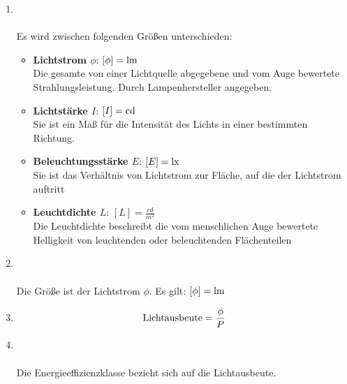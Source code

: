 \begin{enumerate}
    \item   {} \\\\
            
            Es wird zwischen folgenden Größen unterschieden:
            \begin{itemize}
                \item \textbf{Lichtstrom $\phi$}: $\left[\phi\right] = \textnormal{lm}$ \\ Die gesamte von einer Lichtquelle abgegebene und vom Auge bewertete Strahlungsleistung. Durch Lampenhersteller angegeben.
                \item \textbf{Lichtstärke $I$}: $\left[I\right] = \textnormal{cd}$ \\ Sie ist ein Maß für die Intensität des Lichts in einer bestimmten Richtung.
                \item \textbf{Beleuchtungsstärke $E$}: $\left[E\right] = \textnormal{lx}$ \\ Sie ist das Verhältnis von Lichtstrom zur Fläche, auf die der Lichtstrom auftritt
                \item \textbf{Leuchtdichte $L$}: $\left[L\right] = \frac{cd}{m^2}$  \\Die Leuchtdichte beschreibt die vom menschlichen Auge 
                bewertete Helligkeit von leuchtenden oder beleuchtenden 
                Flächenteilen
            \end{itemize}

    \item   {} \\\\
            Die Größe ist der Lichtstrom $\phi$. Es gilt: $\left[\phi\right] = \textnormal{lm}$

    \item   {}
            $$\textnormal{Lichtausbeute} = \frac{\phi}{P}$$

    \item   {} \\\\
            Die Energieeffizienzklasse bezieht sich auf die Lichtausbeute.


\end{enumerate}
